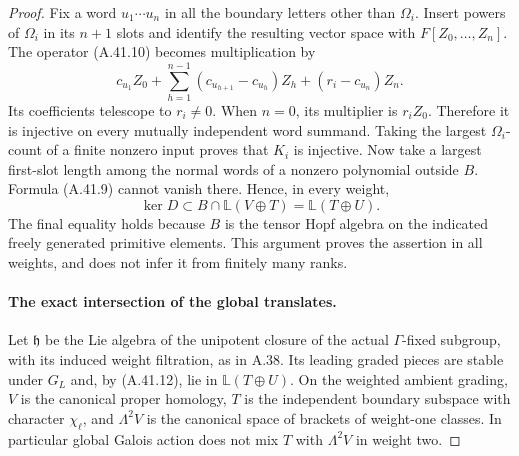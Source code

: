 \begin{proof}
Fix a word \(u_1\cdots u_n\) in all the boundary
letters other than \(\Omega_i\). Insert powers of
\(\Omega_i\) in its \(n+1\) slots and identify the
resulting vector space with \(F[Z_0,\ldots,Z_n]\).
The operator (A.41.10) becomes multiplication by
\[
 c_{u_1}Z_0+\sum_{h=1}^{n-1}(c_{u_{h+1}}-c_{u_h})Z_h
                           +(r_i-c_{u_n})Z_n.        \tag{A.41.11}
\]
Its coefficients telescope to \(r_i\ne0\). When
\(n=0\), its multiplier is \(r_iZ_0\). Therefore
it is injective on every mutually independent word
summand. Taking the largest \(\Omega_i\)-count of
a finite nonzero input proves that \(K_i\) is
injective. Now take a largest first-slot length among
the normal words of a nonzero polynomial outside
\(B\). Formula (A.41.9) cannot vanish there. Hence,
in every weight,
\[
                   \ker D\subset B\cap\mathbb L(V\oplus T)
                                      =\mathbb L(T\oplus U).
                                                               \tag{A.41.12}
\]
The final equality holds because \(B\) is the tensor
Hopf algebra on the indicated freely generated primitive
elements. This argument proves the assertion in all
weights, and does not infer it from finitely many ranks.

\paragraph{The exact intersection of the global translates.}
Let \(\mathfrak h\) be the Lie algebra of the
unipotent closure of the actual \(\Gamma\)-fixed
subgroup, with its induced weight filtration, as in
A.38. Its leading graded pieces are stable under
\(G_L\) and, by (A.41.12), lie in
\(\mathbb L(T\oplus U)\). On the weighted ambient
grading, \(V\) is the canonical proper homology,
\(T\) is the independent boundary subspace with
character \(\chi_\ell\), and \(\Lambda^2V\) is
the canonical space of brackets of weight-one classes.
In particular global Galois action does not mix \(T\)
with \(\Lambda^2V\) in weight two.


\end{proof}
